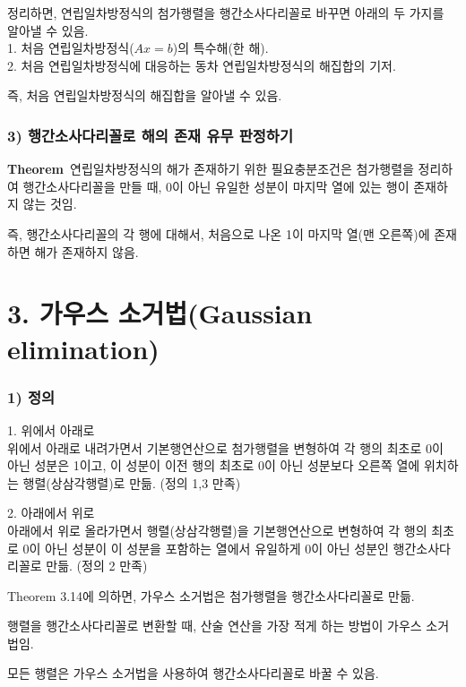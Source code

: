 정리하면, 연립일차방정식의 첨가행렬을 행간소사다리꼴로 바꾸면 아래의 두 가지를 알아낼 수 있음.\\
1. 처음 연립일차방정식($Ax=b$)의 특수해(한 해).\\
2. 처음 연립일차방정식에 대응하는 동차 연립일차방정식의 해집합의 기저.

즉, 처음 연립일차방정식의 해집합을 알아낼 수 있음.

\subsubsection*{3) 행간소사다리꼴로 해의 존재 유무 판정하기}
\textbf{Theorem}\, 연립일차방정식의 해가 존재하기 위한 필요충분조건은 첨가행렬을 정리하여 행간소사다리꼴을 만들 때, 0이 아닌 유일한 성분이 마지막 열에 있는 행이 존재하지 않는 것임.

즉, 행간소사다리꼴의 각 행에 대해서, 처음으로 나온 1이 마지막 열(맨 오른쪽)에 존재하면 해가 존재하지 않음.\\


\section*{3. 가우스 소거법(Gaussian elimination)}
\subsubsection*{1) 정의\\}
\begin{DEF}
1. 위에서 아래로\\
위에서 아래로 내려가면서 기본행연산으로 첨가행렬을 변형하여 각 행의 최초로 0이 아닌 성분은 1이고, 이 성분이 이전 행의 최초로 0이 아닌 성분보다 오른쪽 열에 위치하는 행렬(상삼각행렬)로 만듦. (정의 1,3 만족)

2. 아래에서 위로\\
아래에서 위로 올라가면서 행렬(상삼각행렬)을 기본행연산으로 변형하여 각 행의 최초로 0이 아닌 성분이 이 성분을 포함하는 열에서 유일하게 0이 아닌 성분인 행간소사다리꼴로 만듦. (정의 2 만족)
\end{DEF}

Theorem 3.14에 의하면, 가우스 소거법은 첨가행렬을 행간소사다리꼴로 만듦.

행렬을 행간소사다리꼴로 변환할 때, 산술 연산을 가장 적게 하는 방법이 가우스 소거법임.

모든 행렬은 가우스 소거법을 사용하여 행간소사다리꼴로 바꿀 수 있음.\\


\newpage


